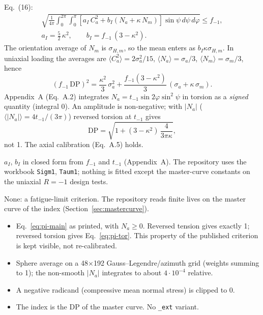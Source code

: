  Eq.~(16):
\begin{gather}
\sqrt{\frac{1}{4\pi}\int_0^{2\pi}\!\!\int_0^{\pi}
\left[a_I\,C_a^2+b_I\left(N_a+\kappa\,N_m\right)\right]\sin\psi\,d\psi\,d\varphi}\le f_{-1},
\label{eq:pi-main}\\
a_I=\tfrac52\,\kappa^2,\qquad b_I=f_{-1}\,(3-\kappa^2).
\label{eq:pi-coef}
\end{gather}
The orientation average of $N_m$ is $\sigma_{H,m}$, so the mean enters as $b_I\kappa\sigma_{H,m}$. In
uniaxial loading the averages are $\langle C_a^2\rangle=2\sigma_a^2/15$,
$\langle N_a\rangle=\sigma_a/3$, $\langle N_m\rangle=\sigma_m/3$, hence
\begin{equation}
(f_{-1}\,\mathrm{DP})^2=\frac{\kappa^2}{3}\,\sigma_a^2+\frac{f_{-1}(3-\kappa^2)}{3}\,(\sigma_a+\kappa\,\sigma_m).
\label{eq:pi-uni}
\end{equation}
Appendix~A (Eq.~A.2) integrates $N_a=t_{-1}\sin2\varphi\sin^2\psi$ in torsion as a \emph{signed}
quantity (integral 0). An amplitude is non-negative; with $\lvert N_a\rvert$ ($\langle\lvert N_a\rvert\rangle=4t_{-1}/(3\pi)$)
reversed torsion at $t_{-1}$ gives
\begin{equation}
\mathrm{DP}=\sqrt{1+(3-\kappa^2)\,\frac{4}{3\pi\kappa}} ,
\label{eq:pi-tor}
\end{equation}
not 1. The axial calibration (Eq.~A.5) holds.

 $a_I$, $b_I$ in closed form from $f_{-1}$ and $t_{-1}$
(Appendix~A). The repository uses the workbook \texttt{Sigm1}, \texttt{Taum1}; nothing is fitted
except the master-curve constants on the uniaxial $R=-1$ design tests.

 None: a fatigue-limit criterion. The repository reads finite lives on the master curve
of the index (Section~\ref{sec:mastercurve}).

\begin{itemize}
\item Eq.~\eqref{eq:pi-main} as printed, with $N_a\ge0$. Reversed tension gives exactly 1; reversed
  torsion gives Eq.~\eqref{eq:pi-tor}. This property of the published criterion is kept visible,
  not re-calibrated.
\item Sphere average on a 48$\times$192 Gauss--Legendre/azimuth grid (weights summing to 1); the
  non-smooth $\lvert N_a\rvert$ integrates to about $4\cdot10^{-4}$ relative.
\item A negative radicand (compressive mean normal stress) is clipped to 0.
\item The index is the DP of the master curve. No \texttt{\_ext} variant.
\end{itemize}

